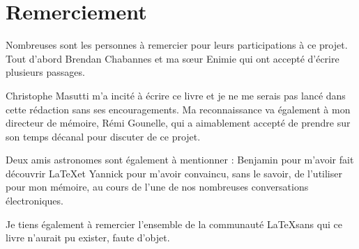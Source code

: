 \section*{Remerciement}

Nombreuses sont les personnes à remercier pour leurs participations à ce projet. Tout d'abord Brendan Chabannes et ma sœur Enimie qui ont accepté d'écrire plusieurs passages.

Christophe Masutti m'a incité à écrire ce livre et je ne me serais pas lancé dans cette rédaction sans ses encouragements. Ma reconnaissance va également à mon directeur de mémoire, Rémi Gounelle, qui a aimablement accepté de prendre sur son temps décanal pour discuter de ce projet.

Deux amis astronomes sont également à mentionner : Benjamin pour m'avoir fait découvrir  \LaTeX et Yannick pour m'avoir convaincu, sans le savoir, de l'utiliser pour mon mémoire, au cours de l'une de nos nombreuses conversations électroniques.

Je tiens également à remercier l'ensemble de la communauté \LaTeX sans qui ce livre n'aurait pu exister, faute d'objet. 

